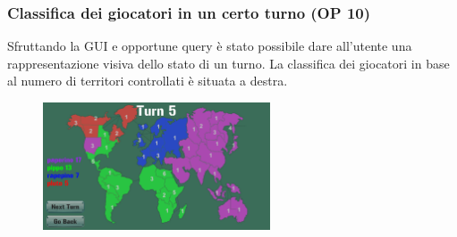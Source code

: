 \documentclass[a4paper,12pt]{report}
\begin{document}
\subsubsection{Classifica dei giocatori in un certo turno (OP 10)}

Sfruttando la GUI e opportune query è stato possibile dare all'utente una rappresentazione
visiva dello stato di un turno. La classifica dei giocatori in base al numero di territori controllati è situata a destra.

\begin{figure}[H]
\centering{}
\begin{center}
\includegraphics[width=0.6\textwidth]{img/report/app/turnView.png}
\end{center}
\label{img:app_turn_view}
\end{figure}
\end{document}
